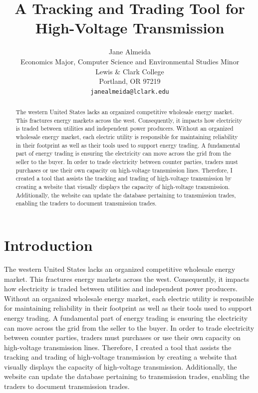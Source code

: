 \documentclass{article}
\title{A Tracking and Trading Tool for High-Voltage Transmission}
\author{
  Jane Almeida\\%
  Economics Major, Computer Science and Environmental Studies Minor\\
  Lewis \& Clark College\\
  Portland, OR 97219 \\
  \texttt{janealmeida@lclark.edu} \\
}
\begin{document}
\maketitle

\begin{abstract}
The western United States lacks an organized competitive wholesale energy market. This fractures energy markets across the west. Consequently, it impacts how electricity is traded between utilities and independent power producers. Without an organized wholesale energy market, each electric utility is responsible for maintaining reliability in their footprint as well as their tools used to support energy trading. A fundamental part of energy trading is ensuring the electricity can move across the grid from the seller to the buyer. In order to trade electricity between counter parties, traders must purchases or use their own capacity on high-voltage transmission lines. Therefore, I created a tool that assists the tracking and trading of high-voltage transmission by creating a website that visually displays the capacity of high-voltage transmission. Additionally, the website can update the database pertaining to transmission trades, enabling the traders to document transmission trades.
\end{abstract}




\section{Introduction}
The western United States lacks an organized competitive wholesale energy market. This fractures energy markets across the west. Consequently, it impacts how electricity is traded between utilities and independent power producers. Without an organized wholesale energy market, each electric utility is responsible for maintaining reliability in their footprint as well as their tools used to support energy trading. A fundamental part of energy trading is ensuring the electricity can move across the grid from the seller to the buyer. In order to trade electricity between counter parties, traders must purchases or use their own capacity on high-voltage transmission lines. Therefore, I created a tool that assists the tracking and trading of high-voltage transmission by creating a website that visually displays the capacity of high-voltage transmission. Additionally, the website can update the database pertaining to transmission trades, enabling the traders to document transmission trades. 
\end{document}
